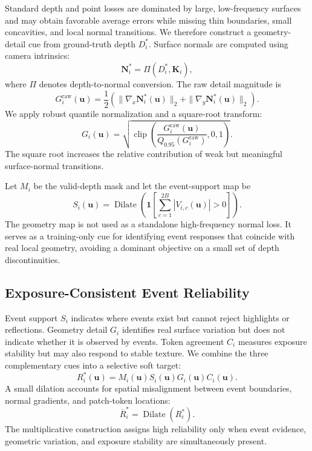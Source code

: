 Standard depth and point losses are dominated by large, low-frequency
surfaces and may obtain favorable average errors while missing thin boundaries,
small concavities, and local normal transitions. We therefore construct a
geometry-detail cue from ground-truth depth $D_i^{\ast}$. Surface normals are
computed using camera intrinsics:
\begin{equation}
    \bm{N}_{i}^{\ast}=\Pi(D_i^{\ast},\bm{K}_i),
    \label{eq:gt_normal}
\end{equation}
where $\Pi$ denotes depth-to-normal conversion. The raw detail magnitude is
\begin{equation}
    G_{i}^{\mathrm{raw}}(\bm{u})=
    \frac{1}{2}\left(
    \|\nabla_x\bm{N}_{i}^{\ast}(\bm{u})\|_2+
    \|\nabla_y\bm{N}_{i}^{\ast}(\bm{u})\|_2
    \right).
\end{equation}
We apply robust quantile normalization and a square-root transform:
\begin{equation}
    G_i(\bm{u})=
    \sqrt{
    \operatorname{clip}\!\left(
    \frac{G_{i}^{\mathrm{raw}}(\bm{u})}
    {Q_{0.95}(G_{i}^{\mathrm{raw}})},0,1
    \right)}.
    \label{eq:geometry_detail_map}
\end{equation}
The square root increases the relative contribution of weak but meaningful
surface-normal transitions.

Let $M_i$ be the valid-depth mask and let the event-support map be
\begin{equation}
    S_i(\bm{u})=
    \operatorname{Dilate}\!\left(
    \mathbf{1}\!\left[
    \sum_{c=1}^{2B}|V_{i,c}(\bm{u})|>0
    \right]\right).
    \label{eq:event_support_map}
\end{equation}
The geometry map is not used as a standalone high-frequency normal loss. It
serves as a training-only cue for identifying event responses that coincide
with real local geometry, avoiding a dominant objective on a small set of
depth discontinuities.

\subsection{Exposure-Consistent Event Reliability}
\label{sec:event_reliability}

Event support $S_i$ indicates where events exist but cannot reject highlights
or reflections. Geometry detail $G_i$ identifies real surface variation but
does not indicate whether it is observed by events. Token agreement $C_i$
measures exposure stability but may also respond to stable texture. We combine
the three complementary cues into a selective soft target:
\begin{equation}
    R_i^{\ast}(\bm{u})=
    M_i(\bm{u})S_i(\bm{u})G_i(\bm{u})C_i(\bm{u}).
    \label{eq:reliability_target}
\end{equation}
A small dilation accounts for spatial misalignment between event boundaries,
normal gradients, and patch-token locations:
\begin{equation}
    \overline{R}_i^{\ast}=
    \operatorname{Dilate}(R_i^{\ast}).
\end{equation}
The multiplicative construction assigns high reliability only when event
evidence, geometric variation, and exposure stability are simultaneously
present.

